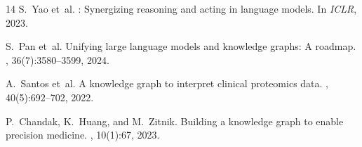 \documentclass[sigconf, anonymous, review]{acmart}
\begin{document}
\begin{thebibliography}{14}
S.~Yao et~al.
: Synergizing reasoning and acting in language models.
\newblock In {\em ICLR}, 2023.

S.~Pan et~al.
\newblock Unifying large language models and knowledge graphs: A roadmap.
, 36(7):3580--3599, 2024.

A.~Santos et~al.
\newblock A knowledge graph to interpret clinical proteomics data.
, 40(5):692--702, 2022.

P.~Chandak, K.~Huang, and M.~Zitnik.
\newblock Building a knowledge graph to enable precision medicine.
, 10(1):67, 2023.

\end{thebibliography}
\end{document}
